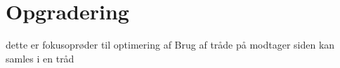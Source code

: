\section{Opgradering}
dette er fokusoprøder til optimering af 
Brug af tråde på modtager siden kan samles i en tråd